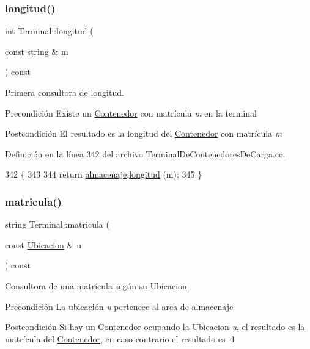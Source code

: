 \subsubsection{\texorpdfstring{longitud()}{longitud()}}
{\footnotesize\ttfamily int Terminal\+::longitud (\begin{DoxyParamCaption}\item[{const string \&}]{m }\end{DoxyParamCaption}) const}



Primera consultora de longitud. 

\begin{DoxyPrecond}{Precondición}
Existe un \hyperlink{class_contenedor}{Contenedor} con matrícula {\itshape m} en la terminal 
\end{DoxyPrecond}
\begin{DoxyPostcond}{Postcondición}
El resultado es la longitud del \hyperlink{class_contenedor}{Contenedor} con matrícula {\itshape m} 
\end{DoxyPostcond}


Definición en la línea 342 del archivo Terminal\+De\+Contenedores\+De\+Carga.\+cc.


\begin{DoxyCode}
342                                              \{
343     
344     \textcolor{keywordflow}{return} \hyperlink{class_terminal_a1d87d7b16c4f460eee6f1ab73da90fd2}{almacenaje}.\hyperlink{class_almacenaje_a745cf4e181058d391aed220843d6cede}{longitud} (m);
345 \}
\end{DoxyCode}
\mbox{\label{class_terminal_a674811a7b56f57ff5b447d10565e923b}} 
\subsubsection{\texorpdfstring{matricula()}{matricula()}}
{\footnotesize\ttfamily string Terminal\+::matricula (\begin{DoxyParamCaption}\item[{const \hyperlink{class_ubicacion}{Ubicacion} \&}]{u }\end{DoxyParamCaption}) const}



Consultora de una matrícula según su \hyperlink{class_ubicacion}{Ubicacion}. 

\begin{DoxyPrecond}{Precondición}
La ubicación {\itshape u} pertenece al area de almacenaje 
\end{DoxyPrecond}
\begin{DoxyPostcond}{Postcondición}
Si hay un \hyperlink{class_contenedor}{Contenedor} ocupando la \hyperlink{class_ubicacion}{Ubicacion} {\itshape u}, el resultado es la matrícula del \hyperlink{class_contenedor}{Contenedor}, en caso contrario el resultado es -\/1 
\end{DoxyPostcond}



